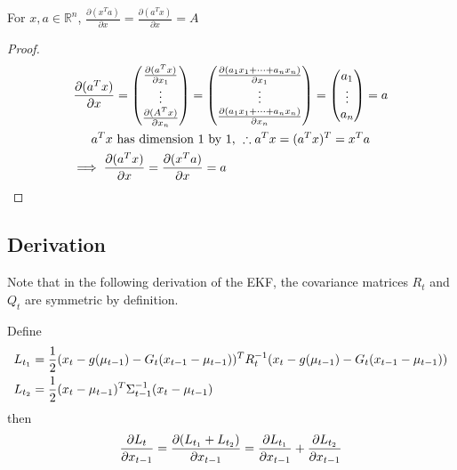 \begin{lemma} \label{lemma2}
	For \(x,a \in \mathbb{R}^n \),
	\(\frac{\partial (x^T a)}{\partial x} = \frac{\partial (a^T x)}{\partial x} = A\)  
\end{lemma}
\begin{proof}
	\begin{multline}
	\frac{\partial (a^T x)}{\partial x}  = \begin{pmatrix}
	\frac{\partial (a^T x)}{\partial x_1} \\
	\vdots \\
	\frac{\partial (A^T x)}{\partial x_n}
	\end{pmatrix} = \begin{pmatrix}
	\frac{\partial (a_1 x_1 + \dots + a_n x_n)}{\partial x_1} \\
	\vdots \\
	\frac{\partial (a_1 x_1 + \dots + a_n x_n)}{\partial x_n}
	\end{pmatrix}
	= \begin{pmatrix}
	a_1 \\
	\vdots \\
	a_n
	\end{pmatrix}
	= a \\
	a^T x \text{ has dimension 1 by 1, } \therefore a^T x = (a^T x)^T = x^T a \\
	\implies \frac{\partial (a^T x)}{\partial x} = \frac{\partial (x^T a)}{\partial x} = a \hfill
	\end{multline}
\end{proof}

\begin{lemma} \label{lemmaInversion}
	
\end{lemma}

\subsection{Derivation}
Note that in the following derivation of the EKF, the covariance matrices \(R_t\) and \(Q_t\) are symmetric by definition.

Define 
\begin{multline*}
L_{t_1} = \frac{1}{2} (x_t - g(\mu_{t-1}) - G_t (x_{t-1} - \mu_{t-1}))^T R_t^{-1} (x_t - g(\mu_{t-1}) - G_t (x_{t-1} - \mu_{t-1})) \\
L_{t_2} = \frac{1}{2} (x_t - \mu_{t-1})^T \Sigma_{t-1}^{-1} (x_t - \mu_{t-1}) \hfill
\end{multline*}
then
\begin{multline*}
\frac{\partial L_t}{\partial x_{t-1}} = \frac{\partial (L_{t_1} + L_{t_2})}{\partial x_{t-1}} = \frac{\partial L_{t_1}}{\partial x_{t-1}} + \frac{\partial L_{t_2}}{\partial x_{t-1}} \hfill
\end{multline*}

